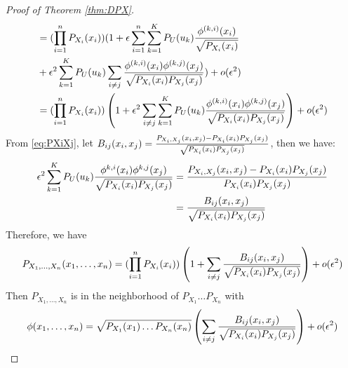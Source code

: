 \begin{proof}[Proof of Theorem \ref{thm:DPX}]
\begin{align*}
&= (\prod_{i=1}^n  P_{X_i} (x_i))
(1+\epsilon\sum_{i=1}^n \sum_{k=1}^{K} P_U(u_k){\phi^{(k,i)}(x_i) \over \sqrt{P_{X_i}(x_i)}} \\
&+\epsilon^2 \sum_{k=1}^{K} P_U(u_k)\sum_{i\neq j}{\phi^{(k,i)}(x_i)\phi^{(k,j)}(x_j)\over \sqrt{P_{X_i}(x_i)P_{X_j}(x_j)} } ) + o(\epsilon^2)\\
&= (\prod_{i=1}^n  P_{X_i} (x_i))
\left(1 +\epsilon^2\sum_{i\neq j} \sum_{k=1}^{K}P_U(u_k){\phi^{(k,i)}(x_i)\phi^{(k,j)}(x_j)\over \sqrt{P_{X_i}(x_i)P_{X_j}(x_j)} }\right) + o(\epsilon^2)
\end{align*}
From \eqref{eq:PXiXj},
let $B_{ij}(x_i, x_j)={P_{X_i, X_j}(x_i,x_j) - P_{X_i}(x_i)P_{X_j}(x_j) \over \sqrt{P_{X_i}(x_i)P_{X_j}(x_j)}} $, then we have:
\begin{align}
\epsilon^2\sum_{k=1}^{K}P_U(u_k)
{\phi^{k,i}(x_i)\phi^{k,j}(x_j)\over \sqrt{P_{X_i}(x_i)P_{X_j}(x_j)} } & = {P_{X_i, X_j}(x_i, x_j) - P_{X_i}(x_i)P_{X_j}(x_j) \over P_{X_i}(x_i)P_{X_j}(x_j)} \notag\\
& = {B_{ij}(x_i, x_j) \over \sqrt{P_{X_i}(x_i)P_{X_j}(x_j)} } \label{eq:Bsecond}
\end{align}
Therefore, we have 
\begin{equation}\label{eq:sep}
P_{X_1,\dots,X_n}(x_1,\dots,x_n) =  (\prod_{i=1}^n  P_{X_i} (x_i))\left ( 1 + \sum_{i\neq j}{B_{ij}(x_i, x_j) \over \sqrt{P_{X_i}(x_i)P_{X_j}(x_j)} }\right) +o(\epsilon^2)
\end{equation}
Then $P_{X_1,\dots, X_n}$ is in the neighborhood of $P_{X_1}\dots P_{X_n}$ with $$\phi(x_1,\dots, x_n)=
\sqrt{P_{X_1}(x_1)\dots P_{X_n}(x_n)}\left(\sum_{i\neq j}{B_{ij}(x_i, x_j) \over \sqrt{P_{X_i}(x_i)P_{X_j}(x_j)} }\right)+o(\epsilon^2)$$


\end{proof}
